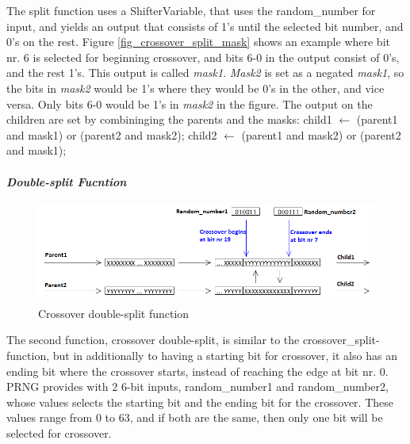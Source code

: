 The split function uses a ShifterVariable, that uses the random\_number for input, and yields an output that consists of 1's until the selected bit number, and 0's on the rest.
Figure \ref{fig_crossover_split_mask} shows an example where bit nr.
6 is selected for beginning crossover, and bits 6-0 in the output consist of 0's, and the rest 1's.
This output is called \emph{mask1}.
\emph{Mask2} is set as a negated \emph{mask1}, so the bits in \emph{mask2} would be 1's where they would be 0's in the other, and vice versa.
Only bits 6-0 would be 1's in \emph{mask2} in the figure.
The output on the children are set by combininging the parents and the masks:
\linebreak child1 $\leftarrow$ (parent1 and mask1) or (parent2 and mask2);
\linebreak child2 $\leftarrow$ (parent1 and mask2) or (parent2 and mask1);


\paragraph{\textit{Double-split Fucntion}}
\begin{figure}[H]
\includegraphics[width=\textwidth]{fpga/fig/crossover_doublesplit.png}
\caption{Crossover double-split function}
\label{fig_crossover_doublesplit}
\end{figure}

The second function, crossover double-split, is similar to the crossover\_split-function, but in additionally to having a starting bit for crossover, it also has an ending bit where the crossover starts, instead of reaching the edge at bit nr.
0.
PRNG provides with 2 6-bit inputs, random\_number1 and random\_number2, whose values selects the starting bit and the ending bit for the crossover.
These values range from 0 to 63, and if both are the same, then only one bit will be selected for crossover.

